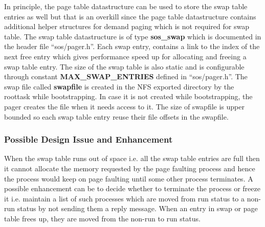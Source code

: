 \documentclass[a4paper, 11pt]{article}
\begin{document}
In principle, the page table datastructure can be used to store the
swap table entries as well but that is an overkill since the page
table datastructure contains additional helper structures for demand
paging which is not required for swap table. The swap table
datastructure is of type {\bf sos\_swap} which is documented in the
header file ``sos/pager.h''. Each swap entry, contains a link to the
index of the next free entry which gives performance speed up for
allocating and freeing a swap table entry. The size of the swap table
is also static and is configurable through constant {\bf
  MAX\_SWAP\_ENTRIES} defined in ``sos/pager.h''. The swap file called
{\bf swapfile} is created in the NFS exported directory by the
roottask while bootstrapping. In case it is not created while
bootstrapping, the pager creates the file when it needs access to
it. The size of swapfile is upper bounded so each swap table entry
reuse their file offsets in the swapfile.

\subsubsection{Possible Design Issue and Enhancement}
When the swap table runs out of space i.e. all the swap table entries
are full then it cannot allocate the memory requested by the page
faulting process and hence the process would keep on page faulting
until some other process terminates. A possible enhancement can be to
decide whether to terminate the process or freeze it i.e. maintain a
list of such processes which are moved from run status to a non-run
status by not sending them a reply message. When an entry in swap or
page table frees up, they are moved from the non-run to run status.
\end{document}
